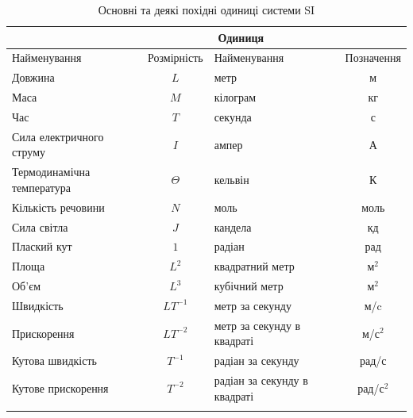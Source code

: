 \begin{table}[h]
\underonespace
\caption{\label{apdxtable:2}Основні та деякі похідні одиниці системи SI}
\begin{tabular}{|>{\raggedright}m{5cm}|c|m{4cm}|c|}
\hline
\multicolumn{2}{|c|}{Величина}&\multicolumn{2}{c|}{Одиниця}\\[0pt]\hline\vspace{4pt}
Найменування & Розмірність & Найменування & Позначення \\[0pt]\hline\hline\vspace{4pt}
Довжина & $L$ & метр & м \\[0pt]\hline\vspace{4pt}
Маса & $M$ & кілограм & кг \\[0pt]\hline\vspace{4pt}
Час & $T$ & секунда & с \\[0pt]\hline\vspace{4pt}
Сила електричного струму & $I$ & ампер & А \\[0pt]\hline\vspace{4pt}
Термодинамічна температура & $\Theta$ & кельвін & К \\[0pt]\hline\vspace{4pt}
Кількість речовини & $N$ & моль & моль \\[0pt]\hline\vspace{4pt}
Сила світла & $J$ & кандела & кд \\[0pt]\hline
\hline\vspace{4pt}
Плаский кут & $1$ & радіан & рад \\[0pt]\hline\vspace{4pt}
Площа & $L^2$ & квадратний метр & м$^2$ \\[0pt]\hline\vspace{4pt}
Об'єм & $L^3$ & кубічний метр & м$^2$\\[0pt]\hline\vspace{4pt}
Швидкість & $LT^{-1}$ & метр за секунду & м/c \\[0pt]\hline\vspace{4pt}
Прискорення & $LT^{-2}$ & метр за секунду в квадраті & м/с$^2$\\[0pt]\hline\vspace{4pt}
Кутова швидкість & $T^{-1}$ & радіан за секунду & рад/с \\[0pt]\hline\vspace{4pt}
Кутове прискорення & $T^{-2}$ & радіан за секунду в квадраті & рад/с$^2$ \\[0pt]\hline\vspace{4pt}

\end{tabular}
\end{table}
